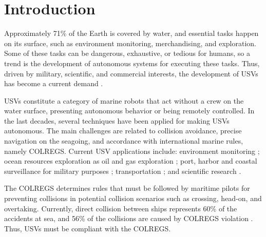 \chapter{Introduction \label{chap:intro}}

    
    Approximately 71\% of the Earth is covered by water, and essential tasks happen on its surface, such as environment monitoring, merchandising, and exploration. Some of these tasks can be dangerous, exhaustive, or tedious for humans, so a trend is the development of autonomous systems for executing these tasks. Thus, driven by military, scientific, and commercial interests, the development of \acp{USV} has become a current demand \cite{Liu2016Unmanned}.
    
    \acp{USV} constitute a category of marine robots that act without a crew on the water surface, presenting autonomous behavior or being remotely controlled. In the last decades, several techniques have been applied for making \acp{USV} autonomous. The main challenges are related to collision avoidance, precise navigation on the seagoing, and accordance with international marine rules, namely \ac{COLREGS}.
    Current \ac{USV} applications include: environment monitoring \cite{Caccia2005Sampling}; ocean resources exploration as oil and gas exploration \cite{Pastore2010Improving}; port, harbor and coastal surveillance for military purposes \cite{Caccia2007unmanned, Pastore2010Improving, Svec2011aAutomated}; transportation \cite{Kiencke2005Impact}; and scientific research \cite{Yan2010Development}.
    
    The \acs{COLREGS} determines rules that must be followed by maritime pilots for preventing collisions in potential collision scenarios such as crossing, head-on, and overtaking. Currently, direct collision between ships represents 60\% of the accidents at sea, and 56\% of the collisions are caused by \acs{COLREGS} violation \cite{Liu2016Unmanned, Campbell2012Review_COLREGs}. Thus, \acp{USV} must be compliant with the \ac{COLREGS}.
    

